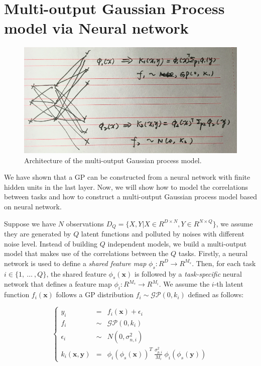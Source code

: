 \section{Multi-output Gaussian Process model via Neural network}\label{sec:mogp}

\begin{figure}[!htb]
    \centering
    \includegraphics[width=\columnwidth]{./img/NN-MOGP.png}
    \caption{Architecture of the multi-output Gaussian process model.}
    \label{fig:MONNGP}
\end{figure}

We have shown that a GP can be constructed from a neural network with finite hidden units in the last layer. Now, we will show how to model the correlations between tasks and how to construct a multi-output Gaussian process model based on neural network.

Suppose we have $N$ observations $D_Q = \{X, Y | X \in R^{D \times N}, Y \in R^{N \times Q}\}$, we assume they are generated by $Q$ latent functions and polluted by noises with different noise level. Instead of building $Q$ independent models, we build a multi-output model that makes use of the correlations between the $Q$ tasks. Firstly, a neural network is used to define a \emph{shared feature map} $\phi_s : R^D \rightarrow R^{M_s}$. Then, for each task $i \in \{1,~\dots~,Q\}$, the shared feature $\phi_s(\bm{x})$ is followed by a \emph{task-specific} neural network that defines a feature map $\phi_i : R^{M_s} \rightarrow R^{M_i}$. We assume the $i$-th latent function $f_i(\bm{x})$ follows a GP distribution $f_i \sim \mathcal{GP}(0, k_i)$ defined as follows:

\begin{equation}
    \label{eq:mo_kernel}
    \left\{
    \begin{array}{lll}
        y_i                 &=&    f_i(\bm{x}) + \epsilon_i  \\
        f_i                 &\sim& \mathcal{GP}(0, k_i)      \\
        \epsilon_i          &\sim& N(0, \sigma_{n, i}^2)     \\
        k_i(\bm{x}, \bm{y}) &=&    \phi_i(\phi_s(\bm{x}))^T~\frac{\sigma_{p, i}^2}{M_i}~\phi_i(\phi_s(\bm{y}))
    \end{array}
    \right.
\end{equation}

